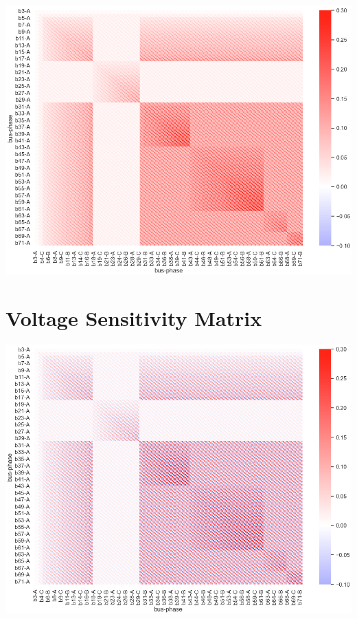 \documentclass[
]{book}
\begin{document}
\begin{center}\includegraphics{Pictures/figHeatmapBRM} \end{center}

\hypertarget{voltage-sensitivity-matrix}{%
\section{Voltage Sensitivity Matrix}\label{voltage-sensitivity-matrix}}

\begin{center}\includegraphics{Pictures/figHeatmapVSM} \end{center}
\end{document}

